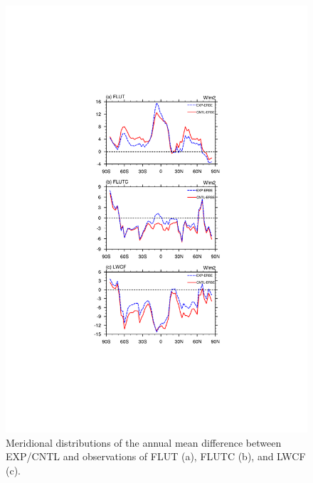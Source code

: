 \documentclass[gmd, manuscript]{copernicus}
\begin{document}
\begin{figure}[t]
\includegraphics[width=12cm]{radiation_curve}
\caption{Meridional distributions of the annual mean difference between EXP/CNTL and observations of FLUT (a), FLUTC (b), and LWCF (c).}
\end{figure}

\clearpage





\end{document}
